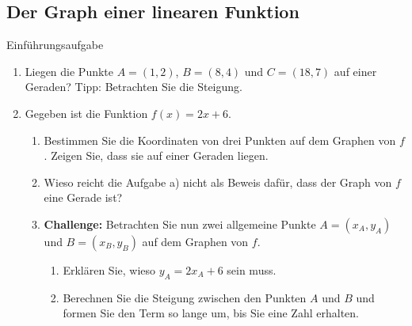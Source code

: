 \subsection{Der Graph einer linearen Funktion}
\begin{LA}
    {Einführungsaufgabe}{}
    \begin{enumerate}
        \item Liegen die Punkte \(A=(1, 2)\), \(B=(8, 4)\) und
              \(C=(18, 7)\) auf einer Geraden?
              Tipp: Betrachten Sie die Steigung.

        \item Gegeben ist die Funktion \(f(x)=2x+6\).

              \begin{enumerate}
                  \item Bestimmen Sie die Koordinaten von drei Punkten
                        auf dem Graphen von \(f\). Zeigen Sie, dass sie
                        auf einer Geraden liegen.

                  \item Wieso reicht die Aufgabe a) nicht als Beweis
                        dafür, dass der Graph von \(f\) eine Gerade ist?

                  \item \textbf{Challenge:}
                        Betrachten Sie nun zwei allgemeine Punkte
                        \(A=(x_A, y_A)\) und \(B=(x_B, y_B)\)
                        auf dem Graphen von \(f\).

                        \begin{enumerate}
                            \item[i)] Erklären Sie, wieso
                                  \(y_A=2x_A+6\) sein muss.

                            \item[ii)] Berechnen Sie die Steigung zwischen den Punkten \(A\) und \(B\) und formen
                                  Sie den Term so lange um, bis Sie eine Zahl erhalten.
                        \end{enumerate}
              \end{enumerate}
    \end{enumerate}
\end{LA}

